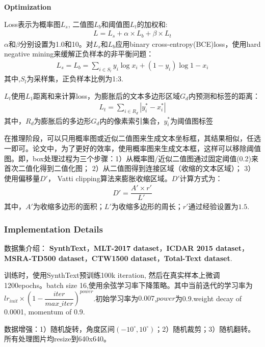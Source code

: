 \documentclass{article}
\begin{document}
\textbf{Optimization}

Loss表示为概率图$L_s$, 二值图$ L_b $和阈值图$L_t$的加权和:
\begin{align}
L=L_s + \alpha \times L_b + \beta \times L_t
\end{align}
$\alpha$和$\beta$分别设置为1.0和10。对$L_s$和$L_b$应用binary cross-entropy(BCE)loss，使用hard negative mining来缓解正负样本的非平衡问题：
\begin{align}
L_s = L_b = \sum_{i \in S_l}{y_i \log{x_i} + (1 - y_i) \log{1 - x_i}} 
\end{align}
其中,$S_l$为采样集，正负样本比例为1:3.

$L_t$使用$L_1$距离和来计算loss，为膨胀后的文本多边形区域$G_d$内预测和标签的距离：
\begin{align}
L_t = \sum_{i \in R_d}{\left| y_i^* - x_i^* \right|}
\end{align}
其中，$R_d$为膨胀后的多边形$G_d$内的像素索引集合，$y_i^*$为阈值图标签

在推理阶段，可以只用概率图或近似二值图来生成文本坐标框，其结果相似，任选一即可。论文中，为了更好的效率，使用概率图来生成文本框，这样可以移除阈值图。即，box处理过程为三个步骤：1）从概率图/近似二值图通过固定阈值(0.2)来首次二值化得到二值化图； 2）从二值图得到连接区域（收缩的文本区域）； 3）使用偏移量$D'$， Vatti clipping算法来膨胀收缩区域。$D'$计算方式为：
\begin{align}
D' = \dfrac{A' \times r'}{L'}
\end{align}
其中，$A'$为收缩多边形的面积；$L'$为收缩多边形的周长；$r'$通过经验设置为$1.5$.

\subsubsection{Implementation Details}
数据集介绍： \textbf{SynthText}，\textbf{MLT-2017 dataset}，\textbf{ICDAR 2015 dataset}，\textbf{MSRA-TD500 dataset}，\textbf{CTW1500 dataset}，\textbf{Total-Text dataset}.

训练时，使用SynthText预训练100k iteration, 然后在真实样本上微调1200epochs。batch size 16,使用余弦学习率下降策略。其中当前迭代的学习率为$lr_{init} \times (1 - \dfrac{iter}{max\_iter})^{power}$.初始学习率为$0.007$,$power$为0.9.weight decay of 0.0001, momentum of 0.9.

数据增强：1）随机旋转，角度区间$(-10^\circ,10^\circ)$；2）随机裁剪；3）随机翻转。所有处理图片均resize到640x640。



\end{document}
